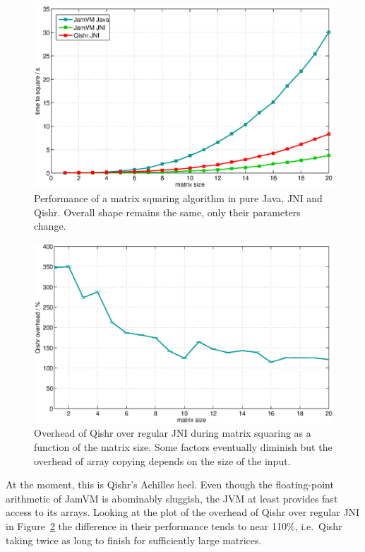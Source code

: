 \documentclass[a4paper,12pt,twoside,openright]{report}
\begin{document}
\begin{figure}
	\centering
	\includegraphics[width=1.1\textwidth]{graph_matrix.eps}
	\caption{Performance of a matrix squaring algorithm in pure Java, JNI and Qishr. Overall shape remains the same, only their parameters change.}
	\label{fig:OverheadMatrix}
\end{figure}

\begin{figure}
	\centering
	\includegraphics[width=1.1\textwidth]{graph_matrix_subtract.eps}
	\caption{Overhead of Qishr over regular JNI during matrix squaring as a function of the matrix size. Some factors eventually diminish but the overhead of array copying depends on the size of the input.}
	\label{fig:OverheadMatrixSubtract}
\end{figure}

At the moment, this is Qishr's Achilles heel. Even though the floating-point arithmetic of JamVM is abominably sluggish, the JVM at least provides fast access to its arrays. Looking at the plot of the overhead of Qishr over regular JNI in Figure~\ref{fig:OverheadMatrixSubtract} the difference in their performance tends to near 110\%, i.e.\ Qishr taking twice as long to finish for sufficiently large matrices. 
\end{document}
